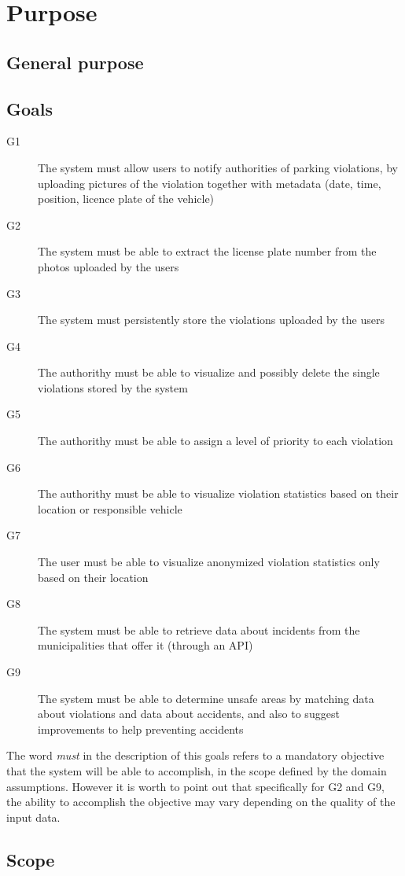 \section{Purpose}

\subsection{General purpose}


\subsection{Goals}

\begin{description}
    \item[G1] The system must allow users to notify authorities of
    parking violations, by uploading pictures of the violation
    together with metadata
    (date, time, position, licence plate of the vehicle)
    \item[G2] The system must be able to extract the license plate number
    from the photos uploaded by the users
    \item[G3] The system must persistently store the violations
    uploaded by the users
    \item[G4] The authorithy must be able to visualize and possibly delete 
    the single violations stored by the system
    \item[G5] The authorithy must be able to assign a level of priority
    to each violation
    \item[G6] The authorithy must be able to visualize violation statistics
    based on their location or responsible vehicle
    \item[G7] The user must be able to visualize anonymized violation
    statistics only based on their location
    \item[G8] The system must be able to retrieve data about incidents
    from the municipalities that offer it (through an API)
    \item[G9] The system must be able to determine unsafe areas by
    matching data about violations and data about accidents, and also
    to suggest improvements to help preventing accidents      
\end{description}

\noindent
The word \emph{must} in the description of this goals refers to a mandatory
objective that the system will be able to accomplish, in the scope defined
by the domain assumptions.
However it is worth to point out that specifically for G2 and G9,
the ability to accomplish the objective may vary depending on the
quality of the input data.

\subsection{Scope}